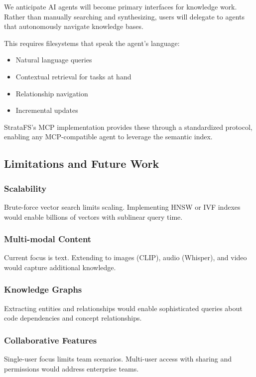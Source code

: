 \documentclass[conference]{IEEEtran}
\begin{document}
We anticipate AI agents will become primary interfaces for knowledge work. Rather than manually searching and synthesizing, users will delegate to agents that autonomously navigate knowledge bases.

This requires filesystems that speak the agent's language:

\begin{itemize}
    \item Natural language queries
    \item Contextual retrieval for tasks at hand
    \item Relationship navigation
    \item Incremental updates
\end{itemize}

StrataFS's MCP implementation provides these through a standardized protocol, enabling any MCP-compatible agent to leverage the semantic index.

\subsection{Limitations and Future Work}

\subsubsection{Scalability}
Brute-force vector search limits scaling. Implementing HNSW or IVF indexes would enable billions of vectors with sublinear query time.

\subsubsection{Multi-modal Content}
Current focus is text. Extending to images (CLIP), audio (Whisper), and video would capture additional knowledge.

\subsubsection{Knowledge Graphs}
Extracting entities and relationships would enable sophisticated queries about code dependencies and concept relationships.

\subsubsection{Collaborative Features}
Single-user focus limits team scenarios. Multi-user access with sharing and permissions would address enterprise teams.
\end{document}
